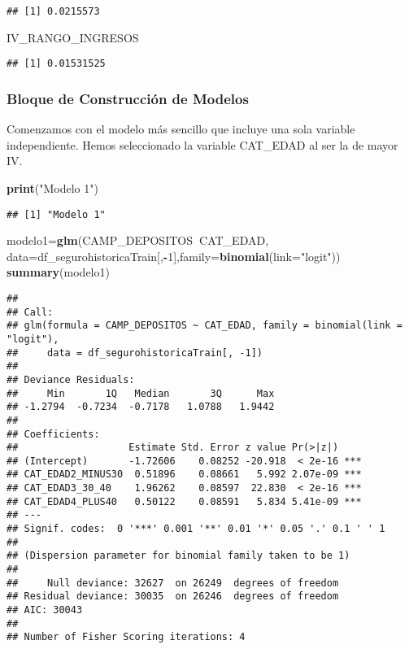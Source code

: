 \documentclass[]{article}
\newenvironment{Shaded}{\begin{snugshade}}{\end{snugshade}}
\newcommand{\KeywordTok}[1]{\textcolor[rgb]{0.13,0.29,0.53}{\textbf{#1}}}
\newcommand{\DataTypeTok}[1]{\textcolor[rgb]{0.13,0.29,0.53}{#1}}
\newcommand{\DecValTok}[1]{\textcolor[rgb]{0.00,0.00,0.81}{#1}}
\newcommand{\StringTok}[1]{\textcolor[rgb]{0.31,0.60,0.02}{#1}}
\newcommand{\OperatorTok}[1]{\textcolor[rgb]{0.81,0.36,0.00}{\textbf{#1}}}
\newcommand{\NormalTok}[1]{#1}
\begin{document}
\begin{verbatim}
## [1] 0.0215573
\end{verbatim}

\begin{Shaded}
\begin{Highlighting}[]
\NormalTok{IV_RANGO_INGRESOS}
\end{Highlighting}
\end{Shaded}

\begin{verbatim}
## [1] 0.01531525
\end{verbatim}

\subsubsection{Bloque de Construcción de
Modelos}\label{bloque-de-construccion-de-modelos}

Comenzamos con el modelo más sencillo que incluye una sola variable
independiente. Hemos seleccionado la variable CAT\_EDAD al ser la de
mayor IV.

\begin{Shaded}
\begin{Highlighting}[]
\KeywordTok{print}\NormalTok{(}\StringTok{"Modelo 1"}\NormalTok{)}
\end{Highlighting}
\end{Shaded}

\begin{verbatim}
## [1] "Modelo 1"
\end{verbatim}

\begin{Shaded}
\begin{Highlighting}[]
\NormalTok{modelo1=}\KeywordTok{glm}\NormalTok{(CAMP_DEPOSITOS}\OperatorTok{~}\NormalTok{CAT_EDAD, }\DataTypeTok{data=}\NormalTok{df_segurohistoricaTrain[,}\OperatorTok{-}\DecValTok{1}\NormalTok{],}\DataTypeTok{family=}\KeywordTok{binomial}\NormalTok{(}\DataTypeTok{link=}\StringTok{"logit"}\NormalTok{))}
\KeywordTok{summary}\NormalTok{(modelo1)}
\end{Highlighting}
\end{Shaded}

\begin{verbatim}
## 
## Call:
## glm(formula = CAMP_DEPOSITOS ~ CAT_EDAD, family = binomial(link = "logit"), 
##     data = df_segurohistoricaTrain[, -1])
## 
## Deviance Residuals: 
##     Min       1Q   Median       3Q      Max  
## -1.2794  -0.7234  -0.7178   1.0788   1.9442  
## 
## Coefficients:
##                   Estimate Std. Error z value Pr(>|z|)    
## (Intercept)       -1.72606    0.08252 -20.918  < 2e-16 ***
## CAT_EDAD2_MINUS30  0.51896    0.08661   5.992 2.07e-09 ***
## CAT_EDAD3_30_40    1.96262    0.08597  22.830  < 2e-16 ***
## CAT_EDAD4_PLUS40   0.50122    0.08591   5.834 5.41e-09 ***
## ---
## Signif. codes:  0 '***' 0.001 '**' 0.01 '*' 0.05 '.' 0.1 ' ' 1
## 
## (Dispersion parameter for binomial family taken to be 1)
## 
##     Null deviance: 32627  on 26249  degrees of freedom
## Residual deviance: 30035  on 26246  degrees of freedom
## AIC: 30043
## 
## Number of Fisher Scoring iterations: 4
\end{verbatim}
\end{document}
